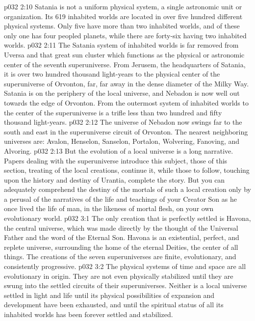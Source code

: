 \vs p032 2:10 Satania is not a uniform physical system, a single astronomic unit or organization. Its 619 inhabited worlds are located in over five hundred different physical systems. Only five have more than two inhabited worlds, and of these only one has four peopled planets, while there are forty\hyp{}six having two inhabited worlds.
\vs p032 2:11 The Satania system of inhabited worlds is far removed from Uversa and that great sun cluster which functions as the physical or astronomic center of the seventh superuniverse. From Jerusem, the headquarters of Satania, it is over two hundred thousand light\hyp{}years to the physical center of the superuniverse of Orvonton, far, far away in the dense diameter of the Milky Way. Satania is on the periphery of the local universe, and Nebadon is now well out towards the edge of Orvonton. From the outermost system of inhabited worlds to the center of the superuniverse is a trifle less than two hundred and fifty thousand light\hyp{}years.
\vs p032 2:12 The universe of Nebadon now swings far to the south and east in the superuniverse circuit of Orvonton. The nearest neighboring universes are: Avalon, Henselon, Sanselon, Portalon, Wolvering, Fanoving, and Alvoring.
\pc \vs p032 2:13 But the evolution of a local universe is a long narrative. Papers dealing with the superuniverse introduce this subject, those of this section, treating of the local creations, continue it, while those to follow, touching upon the history and destiny of Urantia, complete the story. But you can adequately comprehend the destiny of the mortals of such a local creation only by a perusal of the narratives of the life and teachings of your Creator Son as he once lived the life of man, in the likeness of mortal flesh, on your own evolutionary world.\plusone
{}
\vs p032 3:1 The only creation that is perfectly settled is Havona, the central universe, which was made directly by the thought of the Universal Father and the word of the Eternal Son. Havona is an existential, perfect, and replete universe, surrounding the home of the eternal Deities, the center of all things. The creations of the seven superuniverses are finite, evolutionary, and consistently progressive.
\vs p032 3:2 The physical systems of time and space are all evolutionary in origin. They are not even physically stabilized until they are swung into the settled circuits of their superuniverses. Neither is a local universe settled in light and life until its physical possibilities of expansion and development have been exhausted, and until the spiritual status of all its inhabited worlds has been forever settled and stabilized.
